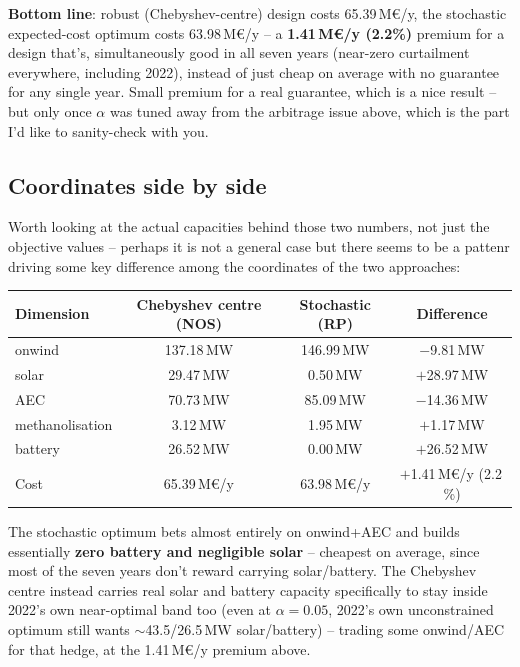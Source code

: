 \documentclass[11pt]{article}
\begin{document}
\textbf{Bottom line}: robust (Chebyshev-centre) design costs
65.39\,M€/y, the stochastic expected-cost optimum costs 63.98\,M€/y --
a \textbf{1.41\,M€/y (2.2\%)} premium for a design that's,
simultaneously good in all seven years (near-zero curtailment everywhere,
including 2022), instead of just cheap on average with no guarantee for
any single year. Small premium for a real guarantee, which is a nice
result -- but only once $\alpha$ was tuned away from the arbitrage issue
above, which is the part I'd like to sanity-check with you.

\subsection{Coordinates side by side}
Worth looking at the actual capacities behind those two numbers, not just
the objective values -- perhaps it is not a general case but there seems to
be a pattenr driving some key difference among the coordinates of the two
approaches:

\begin{center}
\small
\begin{tabular}{@{}lccc@{}}
\toprule
Dimension & Chebyshev centre (NOS) & Stochastic (RP) & Difference \\
\midrule
onwind           & 137.18\,MW & 146.99\,MW &  $-$9.81\,MW \\
solar            &  29.47\,MW &   0.50\,MW & $+$28.97\,MW \\
AEC              &  70.73\,MW &  85.09\,MW & $-$14.36\,MW \\
methanolisation  &   3.12\,MW &   1.95\,MW &  $+$1.17\,MW \\
battery          &  26.52\,MW &   0.00\,MW & $+$26.52\,MW \\
\midrule
Cost             & 65.39\,M€/y & 63.98\,M€/y & $+$1.41\,M€/y (2.2\,\%) \\
\bottomrule
\end{tabular}
\end{center}

The stochastic optimum bets almost entirely on onwind+AEC and builds
essentially \textbf{zero battery and negligible solar} -- cheapest on
average, since most of the seven years don't reward carrying
solar/battery. The Chebyshev centre instead carries real solar and
battery capacity specifically to stay inside 2022's own near-optimal band
too (even at $\alpha=0.05$, 2022's own unconstrained optimum still wants
$\sim$43.5/26.5\,MW solar/battery) -- trading some onwind/AEC for that
hedge, at the 1.41\,M€/y premium above.
\end{document}
